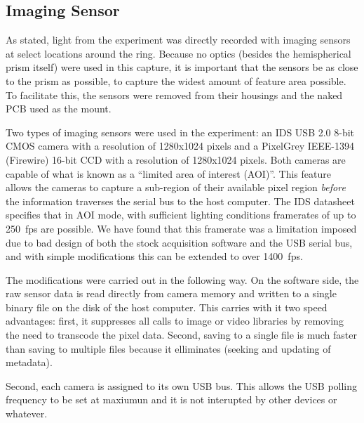 \subsection{Imaging Sensor}
As stated, light from the experiment was directly recorded with imaging
sensors at select locations around the ring.  Because no optics (besides
the hemispherical prism itself) were used in this capture, it is important
that the sensors be as close to the prism as possible, to capture the
widest amount of feature area possible.  To facilitate this, the sensors
were removed from their housings and the naked PCB used as the mount.

Two types of imaging sensors were used in the experiment: an IDS USB 2.0
8-bit CMOS camera with a resolution of 1280x1024 pixels and a PixelGrey
IEEE-1394 (Firewire) 16-bit CCD  with a resolution of 1280x1024 pixels.
Both cameras are capable of what is known as a ``limited area of interest
(AOI)''.  This feature allows the cameras to capture a sub-region of their
available pixel region \textit{before} the information traverses the serial
bus to the host computer.  The IDS datasheet specifies that in AOI mode,
with sufficient lighting conditions framerates of up to \SI{250}{fps} are
possible.  We have found that this framerate was a limitation imposed due
to bad design of both the stock acquisition software and the USB serial
bus, and with simple modifications this can be extended to over \SI{1400}{fps}.

The modifications were carried out in the following way.  On the software
side, the raw sensor data is read directly from camera memory and written
to a single binary file on the disk of the host computer.  This carries
with it two speed advantages: first, it suppresses all calls to image or
video libraries by removing the need to transcode the pixel data.  Second,
saving to a single file is much faster than saving to multiple files
because it elliminates (seeking and updating of metadata).

Second, each camera is assigned to its own USB bus.  This allows the USB
polling frequency to be set at maxiumun and it is not interupted by other
devices or whatever.
